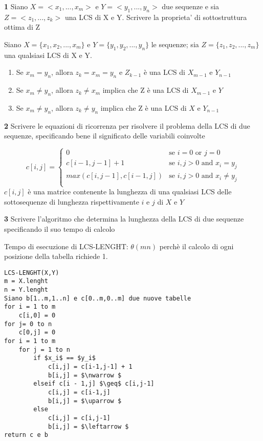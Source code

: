 \documentclass[12pt, a4paper, openany]{book}
\newcommand{\domanda}[2]{\begin{box_domanda}\textbf{#1} #2\end{box_domanda}}
\newcommand{\risposta}[1]{#1}
\newcommand{\reflibro}[1]{}%
\begin{document}
\domanda{1}{
    Siano $X=<x_1,...,x_m>$ e $Y=< y_1,...,y_n>$ due sequenze e sia $Z=<z_1,...,z_k>$
    una LCS di X e Y. Scrivere la proprieta’ di sottostruttura ottima di Z    
}
\risposta{
    Siano $X=\{x_1,x_2,...,x_m\}$ e $Y=\{y_1,y_2,...,y_n\}$ le sequenze; sia $Z=\{z_1,z_2,...,z_m\}$ una qualsiasi LCS di X e Y.
\begin{enumerate}
    \item Se $x_m = y_n$, allora $z_k = x_m =y_n$ e $Z_{k-1}$ è  una LCS di $X_{m-1}$ e $Y_{n-1}$
    \item Se $x_m \neq y_n$, allora $z_k \neq x_m$ implica che Z è una LCS di $X_{m-1}$ e $Y$
    \item Se $x_m \neq y_n$, allora $z_k \neq y_n$ implica che Z è una LCS di $X$ e $Y_{n-1}$
\end{enumerate}
}
\reflibro{Teorema 15.1 pag 325}
\domanda{2}{
Scrivere le equazioni di ricorrenza per risolvere il problema della LCS di due
sequenze, specificando bene il significato delle variabili coinvolte 
}
\risposta{
\begin{equation*}
    c[i,j] = \begin{cases}
        0                      & \text{se $i = 0$ or $j = 0$}           \\
        c[i-1,j-1] + 1         & \text{se $i,j > 0$ and $x_i = y_j$}    \\
        max(c[i,j-1], c[i-1,j]) & \text{se $i,j > 0$ and $x_i \neq y_j$} \\
    \end{cases}
\end{equation*}
$c[i,j]$ è una matrice contenente la lunghezza di una qualsiasi LCS delle sottosequenze di lunghezza rispettivamente $i$ e $j$ di $X$ e $Y$
}
\reflibro{“Fase 2: una soluzione ricorsiva” pag. 325}
\domanda{3}{
    Scrivere l’algoritmo che determina la lunghezza della LCS di due sequenze
    specificando il suo tempo di calcolo\\
}
\risposta{
Tempo di esecuzione di LCS-LENGHT: $\theta(mn)$ perchè il calcolo di ogni posizione della tabella richiede 1.
} 
\begin{lstlisting}[mathescape=true] 
LCS-LENGHT(X,Y)
m = X.lenght
n = Y.lenght
Siano b[1..m,1..n] e c[0..m,0..m] due nuove tabelle
for i = 1 to m
    c[i,0] = 0
for j= 0 to n
    c[0,j] = 0
for i = 1 to m
    for j = 1 to n
        if $x_i$ == $y_i$
            c[i,j] = c[i-1,j-1] + 1  
            b[i,j] = $\nwarrow $
        elseif c[i - 1,j] $\geq$ c[i,j-1]
            c[i,j] = c[i-1,j]  
            b[i,j] = $\uparrow $
        else
            c[i,j] = c[i,j-1]  
            b[i,j] = $\leftarrow $
return c e b
\end{lstlisting}
\reflibro{"Fase 3: Calcolare la lunghezza di una LCS" pag.326}
\end{document}
